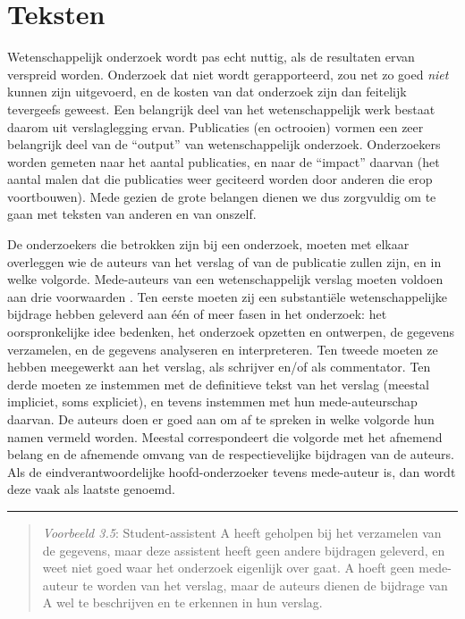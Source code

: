 \documentclass[
]{book}
\begin{document}
\hypertarget{teksten}{%
\section{Teksten}\label{teksten}}

Wetenschappelijk onderzoek wordt pas echt nuttig, als de resultaten
ervan verspreid worden. Onderzoek dat niet wordt gerapporteerd, zou net
zo goed \emph{niet} kunnen zijn uitgevoerd, en de kosten van dat onderzoek
zijn dan feitelijk tevergeefs geweest. Een belangrijk deel van het
wetenschappelijk werk bestaat daarom uit verslaglegging ervan.
Publicaties (en octrooien) vormen een zeer belangrijk deel van de
``output'' van wetenschappelijk onderzoek. Onderzoekers worden gemeten
naar het aantal publicaties, en naar de ``impact'' daarvan (het aantal
malen dat die publicaties weer geciteerd worden door anderen die erop
voortbouwen). Mede gezien de grote belangen dienen we dus zorgvuldig om
te gaan met teksten van anderen en van onszelf.

De onderzoekers die betrokken zijn bij een onderzoek, moeten met elkaar
overleggen wie de auteurs van het verslag of van de publicatie zullen
zijn, en in welke volgorde. Mede-auteurs van een wetenschappelijk
verslag moeten voldoen aan drie voorwaarden \citep[Ch.10]{ORI12}. Ten eerste
moeten zij een substantiële wetenschappelijke bijdrage hebben geleverd
aan één of meer fasen in het onderzoek: het oorspronkelijke idee
bedenken, het onderzoek opzetten en ontwerpen, de gegevens verzamelen,
en de gegevens analyseren en interpreteren. Ten tweede moeten ze hebben
meegewerkt aan het verslag, als schrijver en/of als commentator. Ten
derde moeten ze instemmen met de definitieve tekst van het verslag
(meestal impliciet, soms expliciet), en tevens instemmen met hun
mede-auteurschap daarvan. De auteurs doen er goed aan om af te spreken
in welke volgorde hun namen vermeld worden. Meestal correspondeert die
volgorde met het afnemend belang en de afnemende omvang van de
respectievelijke bijdragen van de auteurs. Als de eindverantwoordelijke
hoofd-onderzoeker tevens mede-auteur is, dan wordt deze vaak als laatste
genoemd.

\begin{center}\rule{0.5\linewidth}{0.5pt}\end{center}

\begin{quote}
\emph{Voorbeeld 3.5}:
Student-assistent A heeft geholpen bij het verzamelen van de gegevens,
maar deze assistent heeft geen andere bijdragen geleverd, en weet niet
goed waar het onderzoek eigenlijk over gaat. A hoeft geen mede-auteur te
worden van het verslag, maar de auteurs dienen de bijdrage van A wel te
beschrijven en te erkennen in hun verslag.
\end{quote}
\end{document}
